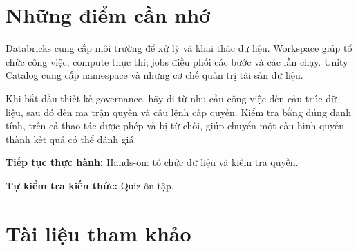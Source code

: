 \FloatBarrier
{}
\section{Những điểm cần nhớ}

Databricks cung cấp môi trường để xử lý và khai thác dữ liệu. Workspace giúp tổ chức công việc; compute thực thi; jobs điều phối các bước và các lần chạy. Unity Catalog cung cấp namespace và những cơ chế quản trị tài sản dữ liệu.


Khi bắt đầu thiết kế governance, hãy đi từ nhu cầu công việc đến cấu trúc dữ liệu, sau đó đến ma trận quyền và câu lệnh cấp quyền. Kiểm tra bằng đúng danh tính, trên cả thao tác được phép và bị từ chối, giúp chuyển một cấu hình quyền thành kết quả có thể đánh giá.


\textbf{Tiếp tục thực hành:} Hands-on: tổ chức dữ liệu và kiểm tra quyền.


\textbf{Tự kiểm tra kiến thức:} Quiz ôn tập.


\FloatBarrier
\clearpage
\section*{Tài liệu tham khảo}

